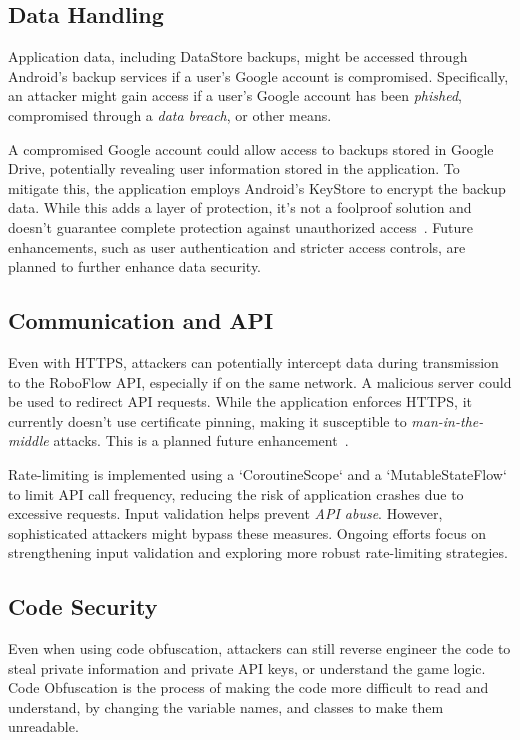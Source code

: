 \subsection{Data Handling}

Application data, including DataStore backups, might be accessed through Android's backup services if a user's Google account is compromised. Specifically, an attacker might gain access if a user's Google account has been \textit{phished}, compromised through a \textit{data breach}, or other means.

A compromised Google account could allow access to backups stored in Google Drive, potentially revealing user information stored in the application.  To mitigate this, the application employs Android's KeyStore to encrypt the backup data. While this adds a layer of protection, it's not a foolproof solution and doesn't guarantee complete protection against unauthorized access~\cite{bib:android_data_backup}.  Future enhancements, such as user authentication and stricter access controls, are planned to further enhance data security.

\subsection{Communication and API}
Even with HTTPS, attackers can potentially intercept data during transmission to the RoboFlow API, especially if on the same network.  A malicious server could be used to redirect API requests. While the application enforces HTTPS, it currently doesn't use certificate pinning, making it susceptible to \textit{man-in-the-middle} attacks. This is a planned future enhancement~\cite{bib:owasp_top_ten}.

Rate-limiting is implemented using a `CoroutineScope` and a `MutableStateFlow` to limit API call frequency, reducing the risk of application crashes due to excessive requests. Input validation helps prevent \textit{API abuse}. However, sophisticated attackers might bypass these measures.  Ongoing efforts focus on strengthening input validation and exploring more robust rate-limiting strategies.

\subsection{Code Security}

Even when using code obfuscation, attackers can still reverse engineer the code to steal private information and private API keys, or understand the game logic. Code Obfuscation is the process of making the code more difficult to read and understand, by changing the variable names, and classes to make them unreadable.

